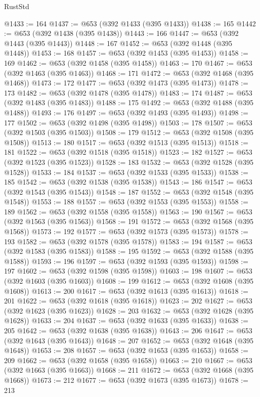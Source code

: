 \begin{lexlean}{RustStd}
\begin{coremodule}
@1433 := 164
@1437 := @653 (@392 @1433 (@395 @1433))
@1438 := 165
@1442 := @653 (@392 @1438 (@395 @1438))
@1443 := 166
@1447 := @653 (@392 @1443 (@395 @1443))
@1448 := 167
@1452 := @653 (@392 @1448 (@395 @1448))
@1453 := 168
@1457 := @653 (@392 @1453 (@395 @1453))
@1458 := 169
@1462 := @653 (@392 @1458 (@395 @1458))
@1463 := 170
@1467 := @653 (@392 @1463 (@395 @1463))
@1468 := 171
@1472 := @653 (@392 @1468 (@395 @1468))
@1473 := 172
@1477 := @653 (@392 @1473 (@395 @1473))
@1478 := 173
@1482 := @653 (@392 @1478 (@395 @1478))
@1483 := 174
@1487 := @653 (@392 @1483 (@395 @1483))
@1488 := 175
@1492 := @653 (@392 @1488 (@395 @1488))
@1493 := 176
@1497 := @653 (@392 @1493 (@395 @1493))
@1498 := 177
@1502 := @653 (@392 @1498 (@395 @1498))
@1503 := 178
@1507 := @653 (@392 @1503 (@395 @1503))
@1508 := 179
@1512 := @653 (@392 @1508 (@395 @1508))
@1513 := 180
@1517 := @653 (@392 @1513 (@395 @1513))
@1518 := 181
@1522 := @653 (@392 @1518 (@395 @1518))
@1523 := 182
@1527 := @653 (@392 @1523 (@395 @1523))
@1528 := 183
@1532 := @653 (@392 @1528 (@395 @1528))
@1533 := 184
@1537 := @653 (@392 @1533 (@395 @1533))
@1538 := 185
@1542 := @653 (@392 @1538 (@395 @1538))
@1543 := 186
@1547 := @653 (@392 @1543 (@395 @1543))
@1548 := 187
@1552 := @653 (@392 @1548 (@395 @1548))
@1553 := 188
@1557 := @653 (@392 @1553 (@395 @1553))
@1558 := 189
@1562 := @653 (@392 @1558 (@395 @1558))
@1563 := 190
@1567 := @653 (@392 @1563 (@395 @1563))
@1568 := 191
@1572 := @653 (@392 @1568 (@395 @1568))
@1573 := 192
@1577 := @653 (@392 @1573 (@395 @1573))
@1578 := 193
@1582 := @653 (@392 @1578 (@395 @1578))
@1583 := 194
@1587 := @653 (@392 @1583 (@395 @1583))
@1588 := 195
@1592 := @653 (@392 @1588 (@395 @1588))
@1593 := 196
@1597 := @653 (@392 @1593 (@395 @1593))
@1598 := 197
@1602 := @653 (@392 @1598 (@395 @1598))
@1603 := 198
@1607 := @653 (@392 @1603 (@395 @1603))
@1608 := 199
@1612 := @653 (@392 @1608 (@395 @1608))
@1613 := 200
@1617 := @653 (@392 @1613 (@395 @1613))
@1618 := 201
@1622 := @653 (@392 @1618 (@395 @1618))
@1623 := 202
@1627 := @653 (@392 @1623 (@395 @1623))
@1628 := 203
@1632 := @653 (@392 @1628 (@395 @1628))
@1633 := 204
@1637 := @653 (@392 @1633 (@395 @1633))
@1638 := 205
@1642 := @653 (@392 @1638 (@395 @1638))
@1643 := 206
@1647 := @653 (@392 @1643 (@395 @1643))
@1648 := 207
@1652 := @653 (@392 @1648 (@395 @1648))
@1653 := 208
@1657 := @653 (@392 @1653 (@395 @1653))
@1658 := 209
@1662 := @653 (@392 @1658 (@395 @1658))
@1663 := 210
@1667 := @653 (@392 @1663 (@395 @1663))
@1668 := 211
@1672 := @653 (@392 @1668 (@395 @1668))
@1673 := 212
@1677 := @653 (@392 @1673 (@395 @1673))
@1678 := 213

\end{coremodule}
\end{lexlean}
